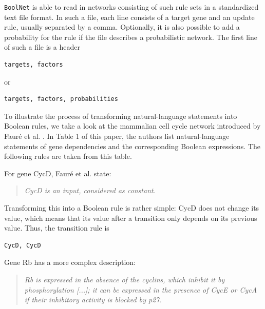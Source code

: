 \documentclass[a4paper]{article}
\begin{document}
\texttt{BoolNet} is able to read in networks consisting of such rule sets in a standardized text file format. In such a file, each line consists of a target gene and an update rule, usually separated by a comma. Optionally, it is also possible to add a probability for the rule if the file describes a probabilistic network. The first line of such a file is a header

\begin{samepage}
\begin{verbatim}
targets, factors
\end{verbatim}

or

\begin{verbatim}
targets, factors, probabilities
\end{verbatim}
\end{samepage}

To illustrate the process of transforming natural-language statements into Boolean rules, we take a look at the mammalian cell cycle network introduced by Faur\'e et al. \cite{faure06}.  In Table 1 of this paper, the authors list natural-language statements of gene dependencies and the corresponding Boolean expressions. The following rules are taken from this table.

For gene CycD, Faur\'e et al. state:
\begin{quote}
\textit{CycD is an input, considered as constant.}
\end{quote}
Transforming this into a Boolean rule is rather simple: CycD does not change its value, which means that its value after a transition only depends on its previous value. Thus, the transition rule is

\begin{verbatim}
CycD, CycD
\end{verbatim} 
 
 Gene Rb has a more complex description:
 
 \begin{quote}
 \textit{Rb is expressed in the absence of the cyclins, which inhibit it by phosphorylation [...]; it can be expressed in the presence of CycE or CycA if their
inhibitory activity is blocked by p27.} 
 \end{quote}
 
\end{document}
